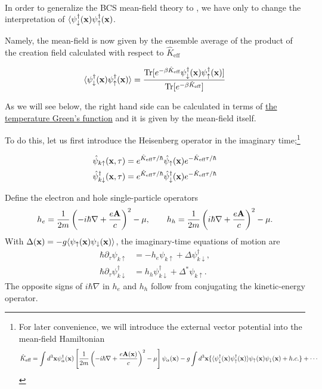 \dotfill

\ 

In order to generalize the BCS mean-field theory to {}, we have only to change the interpretation of $\langle\psi_{\downarrow}^\dagger({\bf x})\psi_{\uparrow}^\dagger({\bf x})$. 

Namely, the mean-field is now given by the ensemble average of the product of the creation field calculated with respect to $\hat{K}_{\text{eff}}$

\[\langle\psi_{\downarrow}^\dagger({\bf x})\psi_{\uparrow}^\dagger({\bf x})\rangle = \frac{\text{Tr}[e^{-\beta\hat{K}_{\text{eff}}}\psi_{\downarrow}^\dagger({\bf x})\psi_{\uparrow}^\dagger({\bf x})]}{\text{Tr}[e^{-\beta\hat{K}_{\text{eff}}}]} \]

As we will see below, the right hand side can be calculated in terms of \uline{the temperature Green's function} and it is given by the mean-field itself. 

To do this, let us first introduce the Heisenberg operator in the imaginary time;\footnote{For later convenience, we will introduce the external vector potential into the mean-field Hamiltonian
\[\hat{K}_{\text{eff}}=\int d^3{\bf x}\psi_{\alpha}^\dagger({\bf x})\left[\frac{1}{2m}\left(-i\hbar\nabla+\frac{e{\bf A}({\bf x})}{c}\right)^2-\mu\right]\psi_{\alpha}({\bf x}) - g\int d^3{\bf x}\{\langle\psi_{\downarrow}^\dagger({\bf x})\psi_{\uparrow}^\dagger({\bf x})\rangle\psi_{\uparrow}({\bf x})\psi_{\downarrow}({\bf x})+ h.c.\}+\cdots \]}

\[\begin{split}
\hat{\psi}_{k\uparrow}({\bf x},\tau) &= e^{\hat{K}_{\text{eff}}\tau/\hbar}\hat{\psi}_{\uparrow}({\bf x})e^{-\hat{K}_{\text{eff}}\tau/\hbar}\\
\hat{\psi}^\dagger_{k\downarrow}({\bf x},\tau) &= e^{\hat{K}_{\text{eff}}\tau/\hbar}\hat{\psi}^\dagger_{\downarrow}({\bf x})e^{-\hat{K}_{\text{eff}}\tau/\hbar}
\end{split} \]

Define the electron and hole single-particle operators
\[h_e=\frac{1}{2m}\left(-i\hbar\nabla+\frac{e{\bf A}}{c}\right)^2-\mu,\qquad
h_h=\frac{1}{2m}\left(i\hbar\nabla+\frac{e{\bf A}}{c}\right)^2-\mu.\]
With $\Delta({\bf x})=-g\langle\psi_\uparrow({\bf x})\psi_\downarrow({\bf x})\rangle$, the imaginary-time equations of motion are
\[\begin{split}
\hbar\partial_\tau\psi_{k\uparrow}&=-h_e\psi_{k\uparrow}+\Delta\psi^\dagger_{k\downarrow},\\
\hbar\partial_\tau\psi^\dagger_{k\downarrow}&=h_h\psi^\dagger_{k\downarrow}+\Delta^*\psi_{k\uparrow}.
\end{split}\]
The opposite signs of $i\hbar\nabla$ in $h_e$ and $h_h$ follow from conjugating the kinetic-energy operator.

